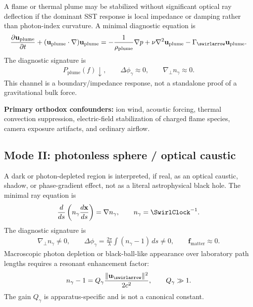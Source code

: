 A flame or thermal plume may be stabilized without significant optical ray
deflection if the dominant SST response is local impedance or damping rather
than photon-index curvature. A minimal diagnostic equation is
\begin{align}
    \frac{\partial\mathbf{u}_{\mathrm{plume}}}{\partial t}
    +
    (\mathbf{u}_{\mathrm{plume}}\cdot\nabla)\mathbf{u}_{\mathrm{plume}}
    =
    -\frac{1}{\rho_{\mathrm{plume}}}\nabla p
    +
    \nu\nabla^2\mathbf{u}_{\mathrm{plume}}
    -
    \Gamma_{\swirlarrow}\mathbf{u}_{\mathrm{plume}}.
    \label{eq:rt_flame_lock_plume_equation}
\end{align}
The diagnostic signature is
\begin{align}
    P_{\mathrm{plume}}(f)\downarrow,
    \qquad
    \Delta\phi_\gamma\approx0,
    \qquad
    \nabla_\perp n_\gamma\approx0.
    \label{eq:rt_flame_lock_signature}
\end{align}
This channel is a boundary/impedance response, not a standalone proof of a
gravitational bulk force.

\textbf{Primary orthodox confounders:}
ion wind, acoustic forcing, thermal convection suppression, electric-field
stabilization of charged flame species, camera exposure artifacts, and ordinary
airflow.

\subsection{Mode II: photonless sphere / optical caustic}

A dark or photon-depleted region is interpreted, if real, as an optical caustic,
shadow, or phase-gradient effect, not as a literal astrophysical black hole. The
minimal ray equation is
\begin{align}
    \frac{d}{ds}
    \left(
    n_\gamma\frac{d\mathbf{x}}{ds}
    \right)
    =
    \nabla n_\gamma,
    \qquad
    n_\gamma=\SwirlClock^{-1}.
    \label{eq:rt_photonless_caustic_ray}
\end{align}
The diagnostic signature is
\begin{align}
    \nabla_\perp n_\gamma\neq0,
    \qquad
    \Delta\phi_\gamma
    =
    \frac{2\pi}{\lambda}
    \int(n_\gamma-1)\,ds
    \neq0,
    \qquad
    \mathbf{f}_{\mathrm{matter}}\approx0.
    \label{eq:rt_photonless_caustic_signature}
\end{align}
Macroscopic photon depletion or black-ball-like appearance over laboratory path
lengths requires a resonant enhancement factor:
\begin{align}
    n_\gamma-1
    =
    Q_\gamma
    \frac{\lVert\mathbf{u}_{\swirlarrow}\rVert^2}{2c^2},
    \qquad
    Q_\gamma\gg1.
    \label{eq:rt_optical_gain_factor}
\end{align}
The gain \(Q_\gamma\) is apparatus-specific and is not a canonical constant.

